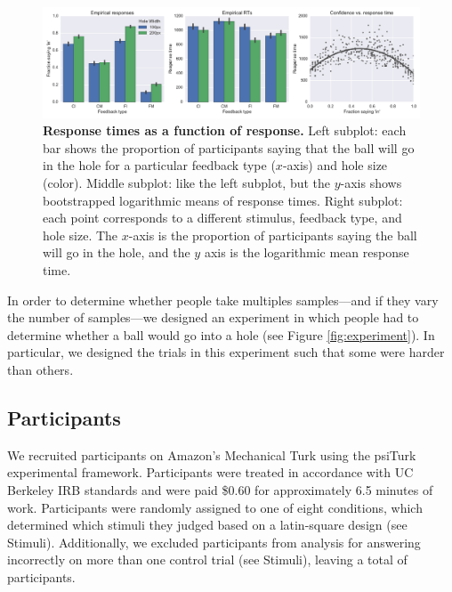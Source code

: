 \documentclass[10pt,letterpaper]{article}
\begin{document}
\begin{figure}[t]
    \begin{center}
        \includegraphics[width=\textwidth]{figures/hole_empirical_results.pdf}
        \caption{\textbf{Response times as a function of response.} Left subplot: each bar shows the proportion of participants saying that the ball will go in the hole for a particular feedback type ($x$-axis) and hole size (color). Middle subplot: like the left subplot, but the $y$-axis shows bootstrapped logarithmic means of response times. Right subplot: each point corresponds to a different stimulus, feedback type, and hole size.  The $x$-axis is the proportion of participants saying the ball will go in the hole, and the $y$ axis is the logarithmic mean response time.}
        \label{fig:pct-vs-rt}
    \end{center}
\end{figure}

In order to determine whether people take multiples samples---and if they vary the number of samples---we designed an experiment in which people had to determine whether a ball would go into a hole (see Figure \ref{fig:experiment}). In particular, we designed the trials in this experiment such that some were harder than others.

\subsection{Participants}

We recruited \HoleNumComplete{} participants on Amazon's Mechanical Turk using the psiTurk \cite{McDonnell12} experimental framework. Participants were treated in accordance with UC Berkeley IRB standards and were paid \$0.60 for approximately 6.5 minutes of work. Participants were randomly assigned to one of eight conditions, which determined which stimuli they judged based on a latin-square design (see Stimuli). Additionally, we excluded \HoleNumFailed{} participants from analysis for answering incorrectly on more than one control trial (see Stimuli), leaving a total of \HoleNumOk{} participants.
\end{document}
